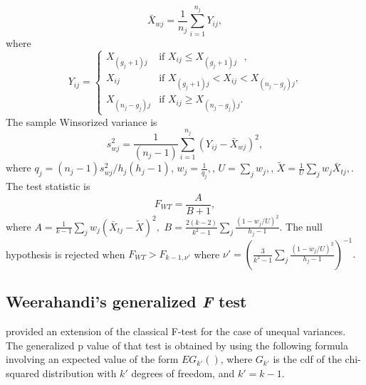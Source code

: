 \begin{equation*}
\bar{X}_{wj}=\frac{1}{n_j}\sum_{i=1}^{n_j}Y_{ij},
\end{equation*}
\noindent where
\begin{equation*}
Y_{ij} =
\begin{cases}
X_{(g_{j}+1)j} & \text{if  $X_{ij}  \leq X_{(g_j+1)j}$ },\\
X_{ij} & \text{if $X_{(g_j+1)j}< X_{ij}< X_{(n_j-g_j)j}$,}\\
X_{(n_j-g_j)j} & \text{if $X_{ij}\geq X_{(n_j-g_j)j}$.}
\end{cases}
\end{equation*}
The sample Winsorized variance is
\begin{equation*}
s_{wj}^2=\frac{1}{(n_j-1)}\sum_{i=1}^{n_j}(Y_{ij}-\bar{X}_{wj})^2,
\end{equation*} 
where 
\begin{math}
q_j={(n_j-1)s_{wj}^2}/{h_j(h_j-1)}
\end{math},
\begin{math}
w_j=\frac{1}{q_j},
\end{math},
\begin{math}
U=\sum_{j}w_j,
\end{math},
\begin{math}
\tilde{X}=\frac{1}{U}\sum_{j}w_j\bar{X}_{tj},
\end{math}.
The test statistic is
\begin{equation}\label{Welch2}
F_{WT}=\frac{A}{B+1},
\end{equation}
where
\begin{math}
A=\frac{1}{k-1}\sum_{j}w_j(\bar{X}_{tj}-\tilde{X})^2,
\end{math}
\begin{math}
B=\frac{2(k-2)}{k^2-1}\sum_{j}\frac{(1-w_j/U)^2}{h_j-1}
\end{math}.
The null hypothesis is rejected when \begin{math} F_{WT}>F_{k-1,\nu'} \end{math} where \begin{math}
\nu' =\left(\frac{3}{k^2-1}\sum_j \frac{(1-w_j/U)^2}{h_j-1}  \right)^{-1}.
\end{math}


\subsection{Weerahandi's generalized \textit{F} test}
\cite{weerahandi1995} provided an extension of the classical F-test for the case of unequal variances. The generalized p value of that test is obtained by using the following formula involving an expected value of the form $EG_{k'} ()$, where $G_{k'}$ is the cdf of the chi-squared distribution with $k'$ degrees of freedom, and $k'=k-1$.

